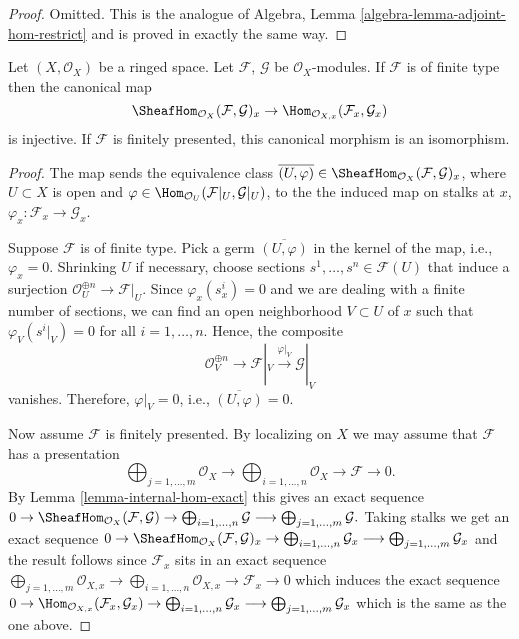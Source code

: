 \begin{proof}
Omitted. This is the analogue of
Algebra, Lemma \ref{algebra-lemma-adjoint-hom-restrict}
and is proved in exactly the same way.
\end{proof}

\begin{lemma}
\label{lemma-stalk-internal-hom}
Let $(X, \mathcal{O}_X)$ be a ringed space.
Let $\mathcal{F}$, $\mathcal{G}$ be $\mathcal{O}_X$-modules.
If $\mathcal{F}$ is of finite type then the canonical map
$$
\SheafHom_{\mathcal{O}_X}(\mathcal{F}, \mathcal{G})_x
\to
\Hom_{\mathcal{O}_{X, x}}(\mathcal{F}_x, \mathcal{G}_x)
$$
is injective.
If $\mathcal{F}$ is finitely presented,
this canonical morphism is an isomorphism.
\end{lemma}

\begin{proof}
The map sends the equivalence class
$\overline{(U,\varphi)}\in
\SheafHom_{\mathcal{O}_X}(\mathcal{F}, \mathcal{G})_x$,
where $U\subset X$ is open and
$\varphi\in\Hom_{\mathcal{O}_U}(\mathcal{F}|_U,\mathcal{G}|_U)$,
to the the induced map on stalks at $x$,
$\varphi_x:\mathcal{F}_x\to\mathcal{G}_x$.

\medskip\noindent Suppose $\mathcal{F}$ is of finite type.
Pick a germ $\overline{(U,\varphi)}$ in the kernel of the map,
i.e., $\varphi_x=0$.
Shrinking $U$ if necessary, choose sections
$s^1,\dots,s^n\in\mathcal{F}(U)$ that induce a surjection
$\mathcal{O}^{\oplus n}_U\to\mathcal{F}|_U$. Since $\varphi_x(s^i_x)=0$
and we are dealing with a finite number of sections,
we can find an open neighborhood 
$V\subset U$ of $x$ such that $\varphi_V(s^i|_V)=0$
for all $i=1,\dots,n$. Hence, the composite
$$
\mathcal{O}^{\oplus n}_V\to\mathcal{F}|_V
\xrightarrow{\varphi|_V}\mathcal{G}|_V
$$
vanishes. Therefore, $\varphi|_V=0$, i.e., $\overline{(U,\varphi)}=0$.
	
\medskip\noindent
Now assume $\mathcal{F}$ is finitely presented.
By localizing on $X$ we may assume that $\mathcal{F}$ has a presentation
$$
\bigoplus\nolimits_{j = 1, \ldots, m}
\mathcal{O}_X
\longrightarrow
\bigoplus\nolimits_{i = 1, \ldots, n}
\mathcal{O}_X
\to
\mathcal{F}
\to
0.
$$
By Lemma \ref{lemma-internal-hom-exact} this gives an exact sequence
$
0 \to
\SheafHom_{\mathcal{O}_X}(\mathcal{F}, \mathcal{G}) \to
\bigoplus\nolimits_{i = 1, \ldots, n} \mathcal{G}
\longrightarrow
\bigoplus\nolimits_{j = 1, \ldots, m} \mathcal{G}.
$
Taking stalks we get an exact sequence
$
0 \to
\SheafHom_{\mathcal{O}_X}(\mathcal{F}, \mathcal{G})_x \to
\bigoplus\nolimits_{i = 1, \ldots, n} \mathcal{G}_x
\longrightarrow
\bigoplus\nolimits_{j = 1, \ldots, m} \mathcal{G}_x
$
and the result follows since $\mathcal{F}_x$ sits in
an exact sequence
$
\bigoplus\nolimits_{j = 1, \ldots, m}
\mathcal{O}_{X, x}
\longrightarrow
\bigoplus\nolimits_{i = 1, \ldots, n}
\mathcal{O}_{X, x}
\to
\mathcal{F}_x
\to
0
$
which induces the exact sequence
$
0 \to
\Hom_{\mathcal{O}_{X, x}}(\mathcal{F}_x, \mathcal{G}_x) \to
\bigoplus\nolimits_{i = 1, \ldots, n} \mathcal{G}_x
\longrightarrow
\bigoplus\nolimits_{j = 1, \ldots, m} \mathcal{G}_x
$
which is the same as the one above.
\end{proof}

